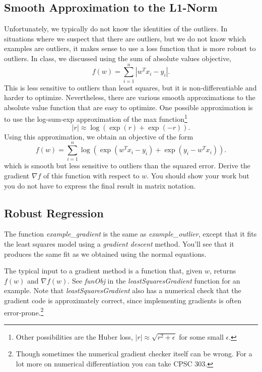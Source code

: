 \documentclass{article}
\def\blu#1{{\color{blu}#1}}
\begin{document}
\subsection{Smooth Approximation to the L1-Norm}

Unfortunately, we typically do not know the identities of the outliers. In situations where we suspect that there are outliers, but we do not know which examples are outliers, it makes sense to use a loss function that is more robust to outliers. In class, we discussed using the sum of absolute values objective,
\[
f(w) = \sum_{i=1}^n |w^Tx_i - y_i|.
\]
This is less sensitive to outliers than least squares, but it is non-differentiable and harder to optimize. Nevertheless, there are various smooth approximations to the absolute value function that are easy to optimize. One possible approximation is to use the log-sum-exp approximation of the max function\footnote{Other possibilities are the Huber loss, $|r| \approx \sqrt{r^2 + \epsilon}$ for some small $\epsilon$.}
\[
|r| \approx \log(\exp(r) + \exp(-r)).
\]
Using this approximation, we obtain an objective of the form
\[
f(w) = \sum_{i=1}^n  \log\left(\exp(w^Tx_i - y_i) + \exp(y_i - w^Tx_i)\right).
\]
which is smooth but less sensitive to outliers than the squared error. \blu{Derive
 the gradient $\nabla f$ of this function with respect to $w$. You should show your work but you do not have to express the final result in matrix notation.}


\subsection{Robust Regression}

The function \emph{example\_gradient} is the same as \emph{example\_outlier}, except that it fits the least squares model using a \emph{gradient descent} method. You'll see that it produces the same fit as we obtained using the normal equations.

The typical input to a gradient method is a function that, given $w$, returns $f(w)$ and $\nabla f(w)$. See \emph{funObj} in the \emph{leastSquaresGradient} function for an example. Note that \emph{leastSquaresGradient} also has a numerical check that the gradient code is approximately correct, since implementing gradients is often error-prone.\footnote{Though sometimes the numerical gradient checker itself can be wrong. For a lot more on numerical differentiation you can take CPSC 303.}
\end{document}
